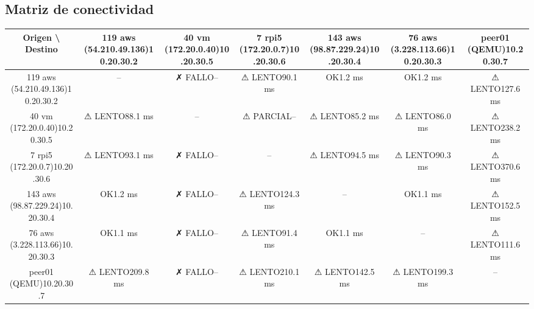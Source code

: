 \documentclass[11pt,a4paper]{article}
\begin{document}
\subsection{Matriz de conectividad}
\begin{longtable}{|c|c|c|c|c|c|c|}
\hline
Origen \textbackslash{} Destino & 119 aws (54.210.49.136)10.20.30.2 & 40 vm (172.20.0.40)10.20.30.5 & 7 rpi5 (172.20.0.7)10.20.30.6 & 143 aws (98.87.229.24)10.20.30.4 & 76 aws (3.228.113.66)10.20.30.3 & peer01 (QEMU)10.20.30.7 \\ \hline
119 aws (54.210.49.136)10.20.30.2 & -- & ✗ FALLO-- & ⚠ LENTO90.1 ms & OK1.2 ms & OK1.2 ms & ⚠ LENTO127.6 ms \\ \hline
40 vm (172.20.0.40)10.20.30.5 & ⚠ LENTO88.1 ms & -- & ⚠ PARCIAL-- & ⚠ LENTO85.2 ms & ⚠ LENTO86.0 ms & ⚠ LENTO238.2 ms \\ \hline
7 rpi5 (172.20.0.7)10.20.30.6 & ⚠ LENTO93.1 ms & ✗ FALLO-- & -- & ⚠ LENTO94.5 ms & ⚠ LENTO90.3 ms & ⚠ LENTO370.6 ms \\ \hline
143 aws (98.87.229.24)10.20.30.4 & OK1.2 ms & ✗ FALLO-- & ⚠ LENTO124.3 ms & -- & OK1.1 ms & ⚠ LENTO152.5 ms \\ \hline
76 aws (3.228.113.66)10.20.30.3 & OK1.1 ms & ✗ FALLO-- & ⚠ LENTO91.4 ms & OK1.1 ms & -- & ⚠ LENTO111.6 ms \\ \hline
peer01 (QEMU)10.20.30.7 & ⚠ LENTO209.8 ms & ✗ FALLO-- & ⚠ LENTO210.1 ms & ⚠ LENTO142.5 ms & ⚠ LENTO199.3 ms & -- \\ \hline
\end{longtable}
\end{document}
